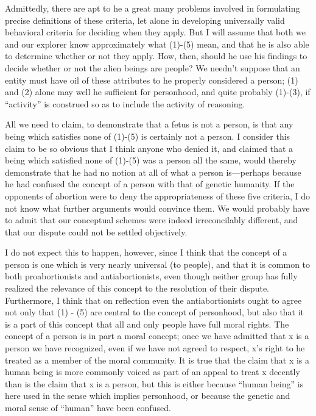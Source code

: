 Admittedly, there are apt to he a great many problems
involved in formulating precise definitions of these
criteria, let alone in developing universally valid
behavioral criteria for deciding when they apply. But I
will assume that both we and our explorer know
approximately what (1)-(5) mean, and that he is also able
to determine whether or not they apply. How, then, should
he use his findings to decide whether or not the alien
beings are people? We needn’t suppose that an entity
must have oil of these attributes to he properly considered
a person; (1) and (2) alone may well he sufficient for
personhood, and quite probably (1)-(3), if “activity” is
construed so as to include the activity of reasoning.

All we need to claim, to demonstrate that a fetus is not a
person, is that any being which satisfies none of (1)-(5) is
certainly not a person. I consider this claim to be so
obvious that I think anyone who denied it, and claimed
that a being which satisfied none of (1)-(5) was a person
all the same, would thereby demonstrate that he had no
notion at all of what a person is—perhaps because he had
confused the concept of a person with that of genetic
humanity. If the opponents of abortion were to deny the
appropriateness of these five criteria, I do not know what
further arguments would convince them. We would
probably have to admit that our conceptual schemes were
indeed irreconcilably different, and that our dispute could
not be settled objectively.

I do not expect this to happen, however, since I think that
the concept of a person is one which is very nearly
universal (to people), and that it is common to both
proabortionists and antiabortionists, even though neither
group has fully realized the relevance of this concept to
the resolution of their dispute. Furthermore, I think that
on reflection even the antiabortionists ought to agree not
only that (1) - (5) are central to the concept of
personhood, but also that it is a part of this concept that
all and only people have full moral rights. The concept of
a person is in part a moral concept; once we have
admitted that x is a person we have recognized, even if we
have not agreed to respect, x’s right to he treated as a
member of the moral community. It is true that the claim
that x is a human being is more commonly voiced as part
of an appeal to treat x decently than is the claim that x is a
person, but this is either because “human being” is here
used in the sense which implies personhood, or because
the genetic and moral sense of “human” have been
confused.

